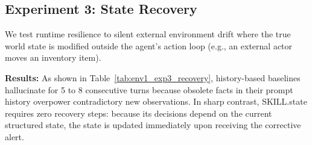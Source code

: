 \documentclass[11pt]{article}
\begin{document}
\begin{table}[h]
\centering
\caption{Warehouse State Recovery (Gemini-3-Flash).}
\label{tab:env1_exp3_recovery}
\end{table}

\subsection{Experiment 3: State Recovery}
\label{subsec:exp3_recovery}

We test runtime resilience to silent external environment drift where the true world state is modified outside the agent's action loop (e.g., an external actor moves an inventory item).

\noindent\textbf{Results:} As shown in Table~\ref{tab:env1_exp3_recovery}, history-based baselines hallucinate for 5 to 8 consecutive turns because obsolete facts in their prompt history overpower contradictory new observations. In sharp contrast, SKILL.state requires zero recovery steps: because its decisions depend on the current structured state, the state is updated immediately upon receiving the corrective alert.
\end{document}
